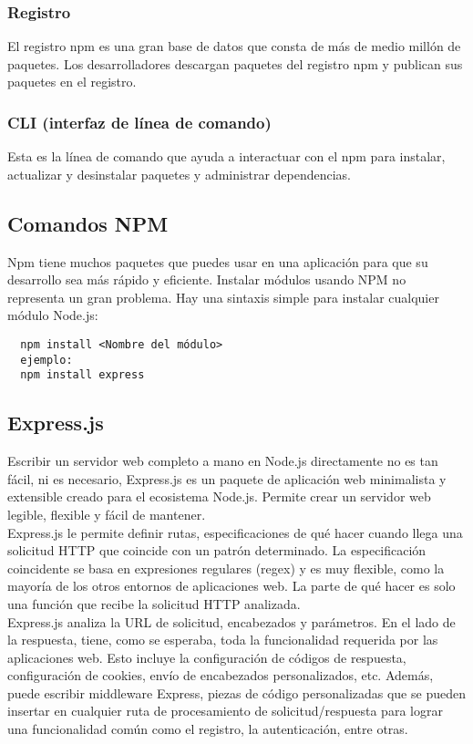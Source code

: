 \subsubsection{Registro}
El registro npm es una gran base de datos que consta de más de medio millón de paquetes. Los desarrolladores descargan paquetes del registro npm y publican sus paquetes en el registro.
\subsubsection{CLI (interfaz de línea de comando)}
Esta es la línea de comando que ayuda a interactuar con el npm para instalar, actualizar y desinstalar paquetes y administrar dependencias.
\subsection{Comandos NPM}
Npm tiene muchos paquetes que puedes usar en una aplicación para que su desarrollo sea más rápido y eficiente. Instalar módulos usando NPM no representa un gran problema. Hay una sintaxis simple para instalar cualquier módulo Node.js:
\begin{verbatim}
  npm install <Nombre del módulo>
  ejemplo:
  npm install express
\end{verbatim}
\subsection{Express.js}
Escribir un servidor web completo a mano en Node.js directamente no es tan fácil, ni es necesario, Express.js es un paquete de aplicación web minimalista y extensible creado para el ecosistema Node.js. Permite crear un servidor web legible, flexible y fácil de mantener. \\[0.8cm]
Express.js le permite definir rutas, especificaciones de qué hacer cuando llega una solicitud HTTP que coincide con un patrón determinado. La especificación coincidente se basa en expresiones regulares (regex) y es muy flexible, como la mayoría de los otros entornos de aplicaciones web. La parte de qué hacer es solo una función que recibe la solicitud HTTP analizada. \\[0.8cm]
Express.js analiza la URL de solicitud, encabezados y parámetros. En el lado de la respuesta, tiene, como se esperaba, toda la funcionalidad requerida por las aplicaciones web. Esto incluye la configuración de códigos de respuesta, configuración de cookies, envío de encabezados personalizados, etc. Además, puede escribir middleware Express, piezas de código personalizadas que se pueden insertar en cualquier ruta de procesamiento de solicitud/respuesta para lograr una funcionalidad común como el registro, la autenticación, entre otras.
